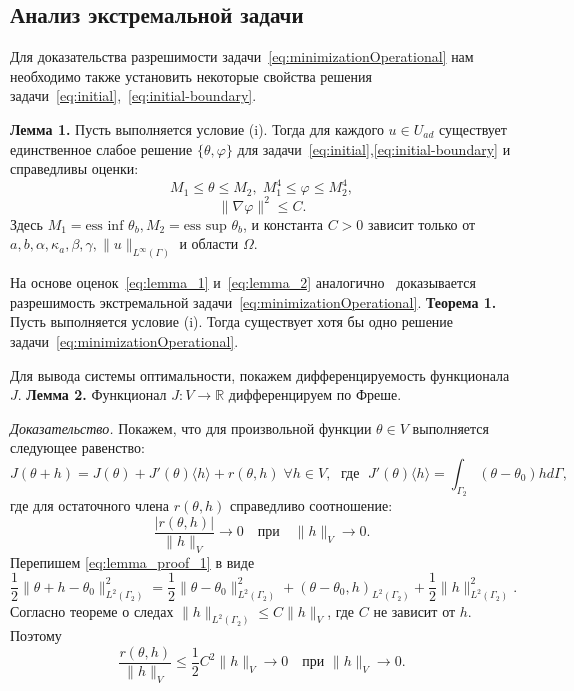 \subsection{Анализ экстремальной задачи}\label{subsec:ch2/sec1/subsec3}

Для доказательства разрешимости задачи~\eqref{eq:minimizationOperational}
нам необходимо также установить некоторые свойства
решения задачи~\eqref{eq:initial},~\eqref{eq:initial-boundary}.

\textbf{Лемма 1.}
Пусть выполняется условие (i).
Тогда для каждого $ u \in U_{ad} $ существует единственное слабое решение
$\{\theta, \varphi \}$ для задачи~\eqref{eq:initial},\eqref{eq:initial-boundary}
и справедливы оценки:
\begin{equation}
    \label{eq:lemma_1}
    M_1 \le \theta \le M_2, \; M_1^4 \le \varphi \le M_2^4,
\end{equation}
\begin{equation}
    \label{eq:lemma_2}
    \| \nabla \varphi \|^2 \le C.
\end{equation}
Здесь $M_1 = \text{ess inf } \theta_b, M_2 = \text{ess sup } \theta_b$, и константа $C > 0$ зависит
только от \\ $a, b, \alpha, \kappa_a, \beta, \gamma, \|u\|_{L^\infty(\Gamma)}$ и области $\Omega$.

На основе оценок~\eqref{eq:lemma_1} и~\eqref{eq:lemma_2} аналогично~\cite{cheb_origin}
доказывается разрешимость экстремальной задачи~\eqref{eq:minimizationOperational}.
\textbf{Теорема 1.}
Пусть выполняется условие (i).
Тогда существует хотя бы одно решение задачи~\eqref{eq:minimizationOperational}.



Для вывода системы оптимальности, покажем дифференцируемость функционала $J$.
\textbf{Лемма 2.}
\label{freshet_diff}
Функционал $J : V \rightarrow \mathbb{R}$ дифференцируем по Фреше.


\textit{Доказательство.}
Покажем, что для произвольной функции $\theta \in V$ выполняется следующее равенство:
\begin{equation}
    \label{eq:lemma_proof_1}
    J(\theta + h) = J(\theta) + J'(\theta)\langle h \rangle
    + r(\theta, h) \; \forall h \in V, \; \text{ где } \;
    J'(\theta)\langle h \rangle = \int_{\Gamma_2} (\theta - \theta_0)h d\Gamma,
\end{equation}
где для остаточного члена $r(\theta,h)$ справедливо соотношение:
\begin{equation}
    \label{lemma_proof_2}
    \frac{|r(\theta,h)|}{\|h\|_V} \rightarrow 0
    \quad \text{при} \quad \|h\|_V \rightarrow 0.
\end{equation}
Перепишем \eqref{eq:lemma_proof_1} в виде
\[
    \frac{1}{2} \|\theta + h - \theta_0\|^2_{L^2(\Gamma_2)} =
    \frac{1}{2} \| \theta - \theta_0 \|^2_{L^2(\Gamma_2)} +
    (\theta - \theta_0, h)_{L^2(\Gamma_2)} +
    \frac{1}{2}\| h \|^2_{L^2(\Gamma_2)}.
\]
Согласно теореме о следах $ \|h\|_{L^2(\Gamma_2)} \le C \|h\|_V $,
где $C$ не зависит от $h$.
Поэтому
\[
    \frac{r(\theta,h)}{\| h \|_V} \leq
    \frac{1}{2} C^2 \| h \|_V \rightarrow 0 \quad \text{при } \| h \|_V \rightarrow 0.
\]


